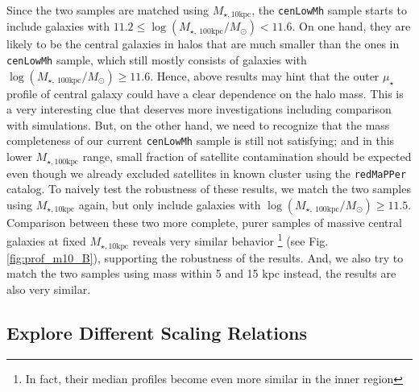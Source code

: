 \documentclass{emulateapj}
\def\redm{\texttt{redMaPPer}}
\def\nbcg{\texttt{cenLowMh}}
\def\minn{{$M_{\star,10\mathrm{kpc}}$}}
\def\mtot{{$M_{\star,100\mathrm{kpc}}$}}
\def\mden{{$\mu_{\star}$}}
\begin{document}
\begin{CJK*}{UTF8}{gbsn}
    Since the two samples are matched using \minn{}, the \nbcg{} sample starts to 
    include galaxies with 
    $11.2 \leq \log (M_{\star,\ 100\mathrm{kpc}}/M_{\odot}) < 11.6$.  
    On one hand, they are likely to be the central galaxies in halos that are 
    much smaller than the ones in \nbcg{} sample, which still mostly consists of 
    galaxies with $\log (M_{\star,\ 100\mathrm{kpc}}/M_{\odot}) \geq 11.6$.  
    Hence, above results may hint that the outer \mden{} profile of central galaxy 
    could have a clear dependence on the halo mass.
    This is a very interesting clue that deserves more investigations including 
    comparison with simulations.  
    But, on the other hand, we need to recognize that the mass completeness of 
    our current \nbcg{} sample is still not satisfying; and in this lower \mtot{} 
    range, small fraction of satellite contamination should be expected even 
    though we already excluded satellites in known cluster using the \redm{} catalog. 
    To naively test the robustness of these results, we match the two samples using 
    \minn{} again, but only include galaxies with 
    $\log (M_{\star,\ 100\mathrm{kpc}}/M_{\odot}) \geq 11.5$.  
    Comparison between these two more complete, purer samples of massive 
    central galaxies at fixed \minn{} reveals very similar behavior
    \footnote{In fact, their median profiles become even more similar in the 
    inner region} (see Fig.\ref{fig:prof_m10_B}), supporting the robustness of the 
    results.  
    And, we also try to match the two samples using mass within 5 and 15 kpc 
    instead, the results are also very similar.  


\subsection{Explore Different Scaling Relations}
    \label{ssec:scaling}


\end{CJK*}
\end{document}
